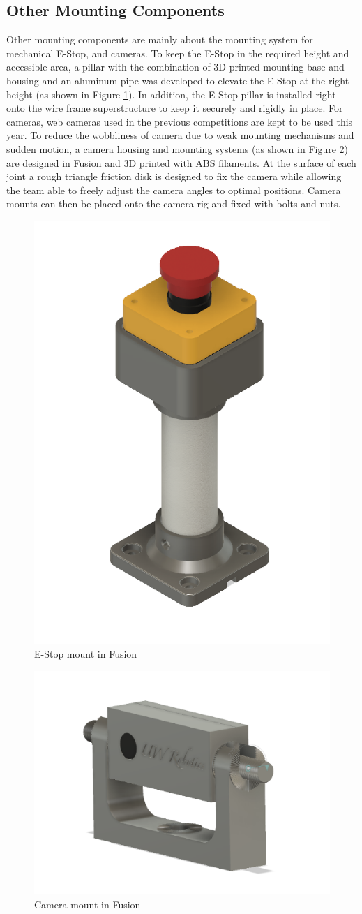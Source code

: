 \documentclass[11pt,journal]{IEEEtran}
\begin{document}
\subsection{Other Mounting Components}
Other mounting components are mainly about the mounting system for mechanical E-Stop, and cameras. To keep the E-Stop in the required height and accessible area, a pillar with the combination of 3D printed mounting base and housing and an aluminum pipe was developed to elevate the E-Stop at the right height (as shown in Figure \ref{ESTOPMount}). In addition, the E-Stop pillar is installed right onto the wire frame superstructure to keep it securely and rigidly in place. For cameras, web cameras used in the previous competitions are kept to be used this year. To reduce the wobbliness of camera due to weak mounting mechanisms and sudden motion, a camera housing and mounting systems (as shown in Figure \ref{CameraMounts}) are designed in Fusion and 3D printed with ABS filaments. At the surface of each joint a rough triangle friction disk is designed to fix the camera while allowing the team able to freely adjust the camera angles to optimal positions. Camera mounts can then be placed onto the camera rig and fixed with bolts and nuts.

\begin{figure}[ht]
\centerline{\includegraphics[width=0.5\columnwidth]{2018DesignMechESTOP.png}}
\caption{E-Stop mount in Fusion}
\label{ESTOPMount}
\end{figure}

\begin{figure}[ht]
\centerline{\includegraphics[width=0.5\columnwidth]{2018DesignMechCamMount.png}}
\caption{Camera mount in Fusion}
\label{CameraMounts}
\end{figure}
\end{document}
